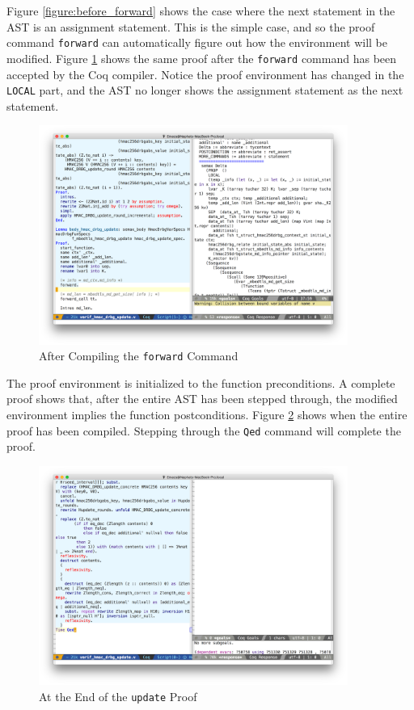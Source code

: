 \documentclass[pageno]{jpaper}
\begin{document}
Figure \ref{figure:before_forward} shows the case where the next statement in the AST is an assignment statement. This is the simple case, and so the proof command \lstinline{forward} can automatically figure out how the environment will be modified. Figure \ref{figure:after_forward} shows the same proof after the \lstinline{forward} command has been accepted by the Coq compiler. Notice the proof environment has changed in the \lstinline{LOCAL} part, and the AST no longer shows the assignment statement as the next statement.

\begin{figure}[h]
\centering
\includegraphics[width=0.9\textwidth]{after_forward}
\caption{After Compiling the \lstinline{forward} Command}
\label{figure:after_forward}
\end{figure}

The proof environment is initialized to the function preconditions. A complete proof shows that, after the entire AST has been stepped through, the modified environment implies the function postconditions. Figure \ref{figure:qed} shows when the entire proof has been compiled. Stepping through the \lstinline{Qed} command will complete the proof.

\begin{figure}[h]
\centering
\includegraphics[width=0.9\textwidth]{qed}
\caption{At the End of the \lstinline{update} Proof}
\label{figure:qed}
\end{figure}
\end{document}
